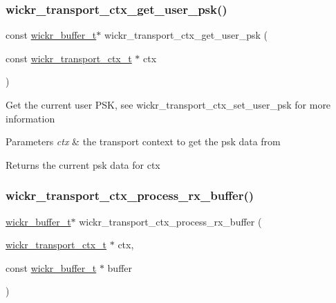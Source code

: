 \subsubsection{\texorpdfstring{wickr\_transport\_ctx\_get\_user\_psk()}{wickr\_transport\_ctx\_get\_user\_psk()}}
{\footnotesize\ttfamily const \mbox{\hyperlink{structwickr__buffer}{wickr\+\_\+buffer\+\_\+t}}$\ast$ wickr\+\_\+transport\+\_\+ctx\+\_\+get\+\_\+user\+\_\+psk (\begin{DoxyParamCaption}\item[{const \mbox{\hyperlink{structwickr__transport__ctx}{wickr\+\_\+transport\+\_\+ctx\+\_\+t}} $\ast$}]{ctx }\end{DoxyParamCaption})}

Get the current user P\+SK, see \textquotesingle{}wickr\+\_\+transport\+\_\+ctx\+\_\+set\+\_\+user\+\_\+psk\textquotesingle{} for more information


\begin{DoxyParams}{Parameters}
{\em ctx} & the transport context to get the psk data from \\
\hline
\end{DoxyParams}
\begin{DoxyReturn}{Returns}
the current psk data for \textquotesingle{}ctx\textquotesingle{} 
\end{DoxyReturn}
\mbox{\label{group__wickr__transport__ctx_gaa0af661e209143c19633e1244ac59db4}} 
\subsubsection{\texorpdfstring{wickr\_transport\_ctx\_process\_rx\_buffer()}{wickr\_transport\_ctx\_process\_rx\_buffer()}}
{\footnotesize\ttfamily \mbox{\hyperlink{structwickr__buffer}{wickr\+\_\+buffer\+\_\+t}}$\ast$ wickr\+\_\+transport\+\_\+ctx\+\_\+process\+\_\+rx\+\_\+buffer (\begin{DoxyParamCaption}\item[{\mbox{\hyperlink{structwickr__transport__ctx}{wickr\+\_\+transport\+\_\+ctx\+\_\+t}} $\ast$}]{ctx,  }\item[{const \mbox{\hyperlink{structwickr__buffer}{wickr\+\_\+buffer\+\_\+t}} $\ast$}]{buffer }\end{DoxyParamCaption})}

